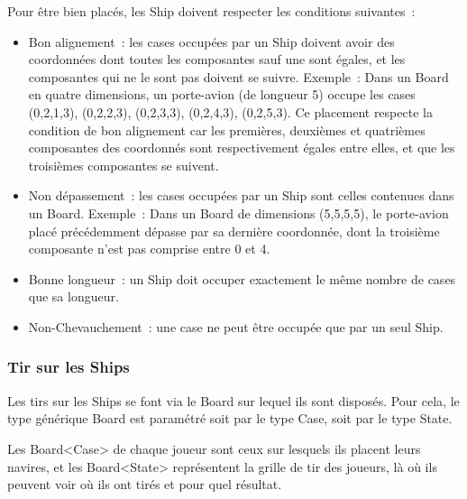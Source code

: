 	Pour être bien placés, les Ship doivent respecter les conditions suivantes~:
	\begin{itemize}
		\item Bon alignement~: les cases occupées par un Ship doivent avoir des coordonnées dont toutes les composantes sauf une sont égales, et les composantes qui ne le sont pas doivent se suivre. \newline
		Exemple~: Dans un Board en quatre dimensions, un porte-avion (de longueur 5) occupe les cases (0,2,1,3), (0,2,2,3), (0,2,3,3), (0,2,4,3), (0,2,5,3). Ce placement respecte la condition de bon alignement car les premières, deuxièmes et quatrièmes composantes des coordonnés sont respectivement égales entre elles, et que les troisièmes composantes se suivent. \newline
		
		\item Non dépassement~: les cases occupées par un Ship sont celles contenues dans un Board. \newline
		Exemple~: Dans un Board de dimensions (5,5,5,5), le porte-avion placé précédemment dépasse par sa dernière coordonnée, dont la troisième composante n'est pas comprise entre 0 et 4. \newline
		
		\item Bonne longueur~: un Ship doit occuper exactement le même nombre de cases que sa longueur. \newline
		
		\item Non-Chevauchement~: une case ne peut être occupée que par un seul Ship.
	\end{itemize}

\subsubsection{Tir sur les Ships}

	Les tirs sur les Ships se font via le Board sur lequel ils sont disposés. Pour cela, le type générique Board est paramétré soit par le type Case, soit par le type State. \newline
	
	Les Board<Case> de chaque joueur sont ceux sur lesquels ils placent leurs navires, et les Board<State> représentent la grille de tir des joueurs, là où ils peuvent voir où ils ont tirés et pour quel résultat. \newline
	
